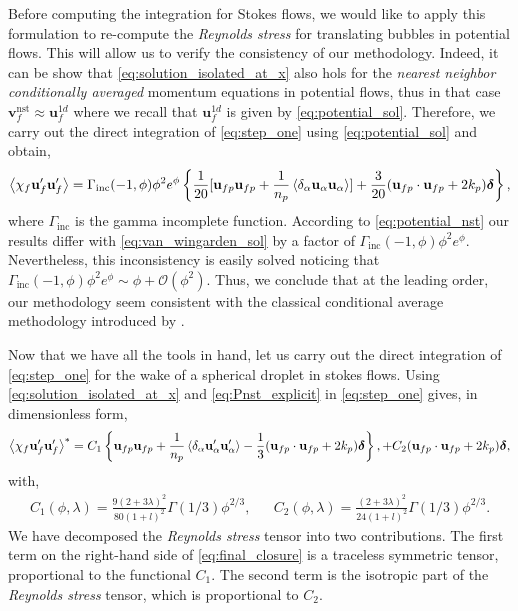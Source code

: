 Before computing the integration for Stokes flows, we would like to apply this formulation to re-compute the \textit{Reynolds stress} for translating bubbles in potential flows. 
This will allow us to verify the consistency of our methodology. 
Indeed, it can be show that \ref{eq:solution_isolated_at_x} also hols for the \textit{nearest neighbor conditionally averaged} momentum equations in potential flows, thus in that case $\textbf{v}^\text{nst}_f \approx \textbf{u}_f^{1d}$ where we recall that $ \textbf{u}_f^{1d}$ is given by \ref{eq:potential_sol}.
Therefore, we carry out the direct integration of \ref{eq:step_one} using \ref{eq:potential_sol} and obtain, 
\begin{equation}
    \avg{\chi_f \textbf{u}_f'\textbf{u}_f'}
    = \Gamma_\text{inc}(-1,\phi)\phi^2 e^\phi \left\{
        \frac{1}{20}[\textbf{u}_{fp}\textbf{u}_{fp}+ \frac{1}{n_p}\pavg{\textbf{u}_\alpha\textbf{u}_\alpha}]
        + 
        \frac{3}{20} (\textbf{u}_{fp}\cdot \textbf{u}_{fp} + 2k_p)\bm\delta
    \right\},
    \label{eq:potential_nst}
\end{equation}
where $\Gamma_\text{inc}$ is the gamma incomplete function. 
According to \ref{eq:potential_nst} our results differ with \ref{eq:van_wingarden_sol} by a factor of $\Gamma_\text{inc}(-1,\phi)\phi^2 e^\phi$. 
Nevertheless, this inconsistency is easily solved noticing that $\Gamma_\text{inc}(-1,\phi)\phi^2 e^\phi \sim \phi + \mathcal{O}(\phi^2)$. 
Thus, we conclude that at the leading order, our methodology seem consistent with the classical conditional average methodology introduced by \citet{batchelor1972sedimentation}. 

Now that we have all the tools in hand, let us carry out the direct integration of \ref{eq:step_one} for the wake of a spherical droplet in stokes flows. 
Using \ref{eq:solution_isolated_at_x} and \ref{eq:Pnst_explicit} in \ref{eq:step_one} gives, in dimensionless form,  
\begin{equation}
    \avg{\chi_f  \textbf{u}_f'\textbf{u}_f'}^*
    = 
    C_1
    \left\{
        \textbf{u}_{fp}\textbf{u}_{fp}+ \frac{1}{n_p}\pavg{\textbf{u}_\alpha'\textbf{u}_\alpha'}
        -\frac{1}{3} (\textbf{u}_{fp}\cdot \textbf{u}_{fp} + 2k_p)\bm\delta
    \right\},    
    +  C_2
    (\textbf{u}_{fp}\cdot \textbf{u}_{fp} + 2k_p)\bm\delta,
    \label{eq:final_closure}
\end{equation}
with,
\begin{align*}
    C_1(\phi,\lambda)
    = \frac{9(2+3\lambda)^2}{80(1+l)^2}
        \Gamma(1/3) \phi^{2/3}
    ,
    &&
    C_2(\phi,\lambda)
    = \frac{(2+3\lambda)^2}{24(1+l)^2}
        \Gamma(1/3) \phi^{2/3}.
\end{align*}
We have decomposed the \textit{Reynolds stress} tensor into two contributions. 
The first term on the right-hand side of \ref{eq:final_closure} is a traceless symmetric tensor, proportional to the functional $C_1$. 
The second term is the isotropic part of the \textit{Reynolds stress} tensor, which is proportional to $C_2$. 

